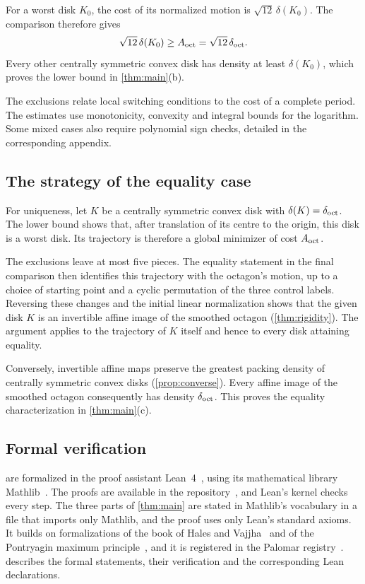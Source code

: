 For a worst disk $K_0$, the cost of its normalized motion is $\sqrt{12}\,\delta(K_0)$.
The comparison therefore gives
\begin{equation}\label{eq:proof-chain}
  \sqrt{12}\,\delta(K_0)\ge A_{\mathrm{oct}}=\sqrt{12}\,\delta_{\mathrm{oct}}.
\end{equation}
Every other centrally symmetric convex disk has density at least $\delta(K_0)$, which proves the
lower bound in \cref{thm:main}(b).

The exclusions relate local switching conditions to the cost of a complete period. The estimates
use monotonicity, convexity and integral bounds for the logarithm. Some mixed cases also require
polynomial sign checks, detailed in the corresponding appendix.

\subsection{The strategy of the equality case}\label{sec:strategy-equality}

For uniqueness, let $K$ be a centrally symmetric convex disk with $\delta(K)=\delta_{\mathrm{oct}}$. The lower
bound shows that, after translation of its centre to the origin, this disk is a worst disk. Its
trajectory is therefore a global minimizer of cost $A_{\mathrm{oct}}$.

The exclusions leave at most five pieces. The equality statement in the final comparison then
identifies this trajectory with the octagon's motion, up to a choice of starting point and a
cyclic permutation of the three control labels. Reversing these changes and the initial linear
normalization shows that the given disk $K$ is an invertible affine image of the smoothed octagon
(\cref{thm:rigidity}). The argument applies to the trajectory of $K$ itself and hence to every
disk attaining equality.

Conversely, invertible affine maps preserve the greatest packing density of centrally symmetric
convex disks (\cref{prop:converse}). Every affine image of the smoothed octagon consequently has
density $\delta_{\mathrm{oct}}$. This proves the equality characterization in \cref{thm:main}(c).

\subsection{Formal verification}\label{sec:intro-formal}

 are formalized in the proof assistant Lean~4~\cite{Lean4}, using its
mathematical library Mathlib~\cite{Mathlib20}. The proofs are available in the
repository~\cite{Companion}, and Lean's kernel checks every step. The three parts of
\cref{thm:main} are stated in Mathlib's vocabulary in a file that imports only Mathlib, and the
proof uses only Lean's standard axioms. It builds on formalizations of the book of Hales and
Vajjha~\cite{SmoothedPolygonLean} and of the Pontryagin maximum
principle~\cite{OptimalControlLean}, and it is registered in the Palomar
registry~\cite{Palomar}.  describes the formal statements, their verification
and the corresponding Lean declarations.

